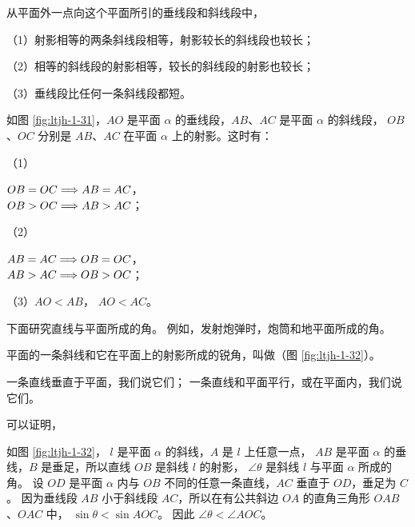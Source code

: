 \begin{dingli}
    从平面外一点向这个平面所引的垂线段和斜线段中，

    （1）射影相等的两条斜线段相等，射影较长的斜线段也较长；

    （2）相等的斜线段的射影相等，较长的斜线段的射影也较长；

    （3）垂线段比任何一条斜线段都短。
\end{dingli}

如图 \ref{fig:ltjh-1-31}，$AO$ 是平面 $\alpha$ 的垂线段，$AB$、$AC$ 是平面 $\alpha$ 的斜线段，
$OB$、$OC$ 分别是 $AB$、$AC$ 在平面 $\alpha$ 上的射影。这时有：

（1） \begin{zmtblr}[t]{}
    $OB = OC  \Longrightarrow  AB = AC$， \\
    $OB > OC  \Longrightarrow  AB > AC$；
\end{zmtblr}

（2）\begin{zmtblr}[t]{}
    $AB = AC  \Longrightarrow  OB = OC$， \\
    $AB > AC  \Longrightarrow  OB > OC$；
\end{zmtblr}

（3）$AO < AB$， $AO < AC$。

下面研究直线与平面所成的角。 例如，发射炮弹时，炮筒和地平面所成的角。

平面的一条斜线和它在平面上的射影所成的锐角，叫做（图 \ref{fig:ltjh-1-32}）。

一条直线垂直于平面，我们说它们；
一条直线和平面平行，或在平面内，我们说它们。

可以证明，

如图 \ref{fig:ltjh-1-32}， $l$ 是平面 $\alpha$ 的斜线，$A$ 是 $l$ 上任意一点，
$AB$ 是平面 $\alpha$ 的垂线，$B$ 是垂足，所以直线 $OB$ 是斜线 $l$ 的射影，
$\angle \theta$ 是斜线 $l$ 与平面 $\alpha$ 所成的角。
设 $OD$ 是平面 $\alpha$ 内与 $OB$ 不同的任意一条直线，$AC$ 垂直于 $OD$，垂足为 $C$。
因为垂线段 $AB$ 小于斜线段 $AC$，所以在有公共斜边 $OA$ 的直角三角形 $OAB$、$OAC$ 中，
$\sin\theta < \sin AOC$。 因此 $\angle \theta < \angle AOC$。

